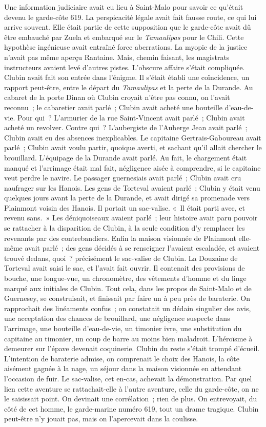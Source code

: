 \documentclass[french,twoside]{book} %
\begin{document}
Une information judiciaire avait eu lieu à Saint-Malo pour savoir ce qu’était devenu le garde-côte 619. La perspicacité légale avait fait fausse route, ce qui lui arrive souvent. Elle était partie de cette supposition que le garde-côte avait dû être embauché par Zuela et embarqué sur le \emph{Tamaulipas} pour le Chili. Cette hypothèse ingénieuse avait entraîné force aberrations. La myopie de la justice n’avait pas même aperçu Rantaine. Mais, chemin faisant, les magistrats instructeurs avaient levé d’autres pistes. L’obscure affaire s’était compliquée. Clubin avait fait son entrée dans l’énigme. Il s’était établi une coïncidence, un rapport peut-être, entre le départ du \emph{Tamaulipas} et la perte de la Durande. Au cabaret de la porte Dinan où Clubin croyait n’être pas connu, on l’avait reconnu ; le cabaretier avait parlé ; Clubin avait acheté une bouteille d’eau-de-vie. Pour qui ? L’armurier de la rue Saint-Vincent avait parlé ; Clubin avait acheté un revolver. Contre qui ? L’aubergiste de l’Auberge Jean avait parlé ; Clubin avait eu des absences inexplicables. Le capitaine Gertrais-Gaboureau avait parlé ; Clubin avait  voulu partir, quoique averti, et sachant qu’il allait chercher le brouillard. L’équipage de la Durande avait parlé. Au fait, le chargement était manqué et l’arrimage était mal fait, négligence aisée à comprendre, si le capitaine veut perdre le navire. Le passager guernesiais avait parlé ; Clubin avait cru naufrager sur les Hanois. Les gens de Torteval avaient parlé ; Clubin y était venu quelques jours avant la perte de la Durande, et avait dirigé sa promenade vers Plainmont voisin des Hanois. Il portait un sac-valise. « Il était parti avec, et revenu sans. » Les déniquoiseaux avaient parlé ; leur histoire avait paru pouvoir se rattacher à la disparition de Clubin, à la seule condition d’y remplacer les revenants par des contrebandiers. Enfin la maison visionnée de Plainmont elle-même avait parlé ; des gens décidés à se renseigner l’avaient escaladée, et avaient trouvé dedans, quoi ? précisément le sac-valise de Clubin. La Douzaine de Torteval avait saisi le sac, et l’avait fait ouvrir. Il contenait des provisions de bouche, une longue-vue, un chronomètre, des vêtements d’homme et du linge marqué aux initiales de Clubin. Tout cela, dans les propos de Saint-Malo et de Guernesey, se construisait, et finissait par faire un à peu près de baraterie. On rapprochait des linéaments confus ; on constatait un dédain singulier des avis, une acceptation des chances de brouillard, une négligence suspecte dans l’arrimage, une bouteille d’eau-de-vie, un timonier ivre, une substitution du capitaine au timonier, un coup de barre au moins bien maladroit. L’héroïsme à demeurer sur l’épave devenait coquinerie. Clubin du  reste s’était trompé d’écueil. L’intention de baraterie admise, on comprenait le choix des Hanois, la côte aisément gagnée à la nage, un séjour dans la maison visionnée en attendant l’occasion de fuir. Le sac-valise, cet en-cas, achevait la démonstration. Par quel lien cette aventure se rattachait-elle à l’autre aventure, celle du garde-côte, on ne le saisissait point. On devinait une corrélation ; rien de plus. On entrevoyait, du côté de cet homme, le garde-marine numéro 619, tout un drame tragique. Clubin peut-être n’y jouait pas, mais on l’apercevait dans la coulisse.\par
\end{document}
